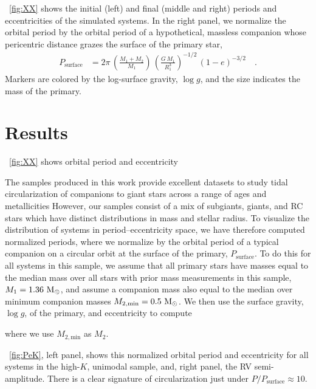 \documentclass[modern, letterpaper]{aastex62}
\newcommand{\logg}{\ensuremath{\log g}}
\begin{document}
\figurename~\ref{fig:XX} shows the initial (left) and final (middle and right)
periods and eccentricities of the simulated systems.
In the right panel, we normalize the orbital period by the orbital period of a
hypothetical, massless companion whose pericentric distance grazes the surface
of the primary star,
\begin{align}
    P_{\textrm{surface}} &= 2\pi \, \left(\frac{M_1+M_2}{M_1}\right) \,
        \left(\frac{G\,M_1}{R_1^3}\right)^{-1/2} \, \left(1-e\right)^{-3/2}
    \quad .
\end{align}
Markers are colored by the log-surface gravity, \logg, and the size indicates
the mass of the primary.

\section{Results}
\label{sec:results}

\figurename~\ref{fig:XX} shows orbital period and eccentricity

The samples produced in this work provide excellent datasets to study tidal
circularization of companions to giant stars across a range of ages and
metallicities
However, our samples consist of a mix of subgiants, giants, and RC stars which
have distinct distributions in mass and stellar radius.
To visualize the distribution of systems in period--eccentricity space, we have
therefore computed normalized periods, where we normalize by the orbital period
of a typical companion on a circular orbit at the surface of the primary,
$P_{\textrm{surface}}$.
To do this for all systems in this sample, we assume that all primary stars have
masses equal to the median mass over all stars with prior mass measurements in
this sample, $M_1 = 1.36~\mathrm{M}_\odot$, and assume a companion mass also equal to the
median over minimum companion masses $M_{2, \textrm{min}} = 0.5~\mathrm{M}_\odot$.
We then use the surface gravity, $\log g$, of the primary, and eccentricity to
compute

where we use $M_{2, \textrm{min}}$ as $M_2$.

\figurename~\ref{fig:PeK}, left panel, shows this normalized orbital period and
eccentricity for all systems in the high-$K$, unimodal sample, and, right panel,
the RV semi-amplitude.
There is a clear signature of circularization just under $P/P_{\textrm{surface}}
\approx 10$.
\end{document}
